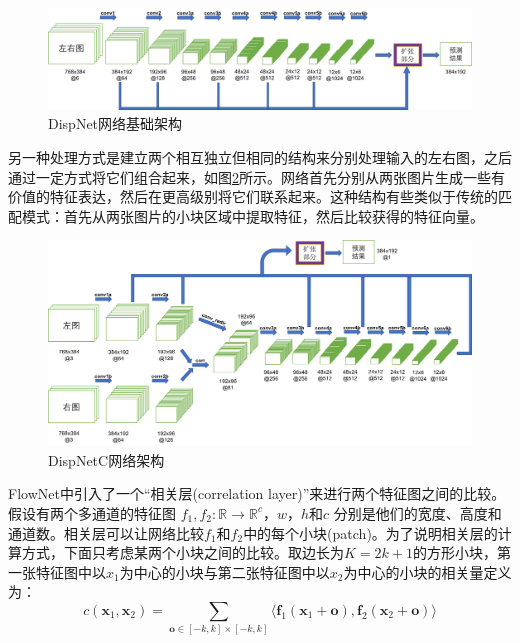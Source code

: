 \begin{figure}[!htbp]
	\centering\includegraphics[width=6in]{figures/4_1_dispnet_architecture}
	\caption{DispNet网络基础架构}\label{fig:4_1_DispNet}
\end{figure}

另一种处理方式是建立两个相互独立但相同的结构来分别处理输入的左右图，之后通过一定方式将它们组合起来，如图\ref{fig:4_1_DispNetC}所示。网络首先分别从两张图片生成一些有价值的特征表达，然后在更高级别将它们联系起来。这种结构有些类似于传统的匹配模式：首先从两张图片的小块区域中提取特征，然后比较获得的特征向量。

\begin{figure}[!htb]
	\centering\includegraphics[width=6in]{figures/4_1_dispnetc_architecture}
	\caption{DispNetC网络架构}\label{fig:4_1_DispNetC}
\end{figure}

FlowNet中引入了一个“相关层(correlation layer)”来进行两个特征图之间的比较。假设有两个多通道的特征图
$f_1, f_2: \mathbb{R} \rightarrow \mathbb{R}^c$，$w$，$h$和$c$ 
分别是他们的宽度、高度和通道数。相关层可以让网络比较$f_1$和$f_2$中的每个小块(patch)。为了说明相关层的计算方式，下面只考虑某两个小块之间的比较。取边长为$K=2k+1$的方形小块，第一张特征图中以$x_1$为中心的小块与第二张特征图中以$x_2$为中心的小块的相关量定义为：
\begin{equation}\label{eq:4_1_correlation}  %
c(\mathbf{x}_1, \mathbf{x}_2) = \sum_{\mathbf{o} \in [-k, k] \times [-k, k]} { \langle \mathbf{f}_1(\mathbf{x}_1 + \mathbf{o}), \mathbf{f}_2(\mathbf{x}_2 + \mathbf{o}) \rangle }
\end{equation}

